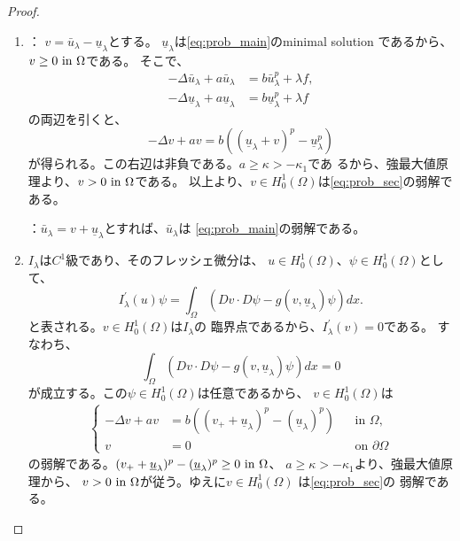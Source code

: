 \begin{proof}
 \begin{enumerate}[1.] \sage
  \item {}：
        $v = \bar{u}_\lambda - \underline{u}_\lambda$とする。
        $\underline{u}_\lambda$は\ref{eq:prob_main}のminimal solution
        であるから、$v \geq 0 ~\text{in}~ \Omega$である。
        そこで、
        \begin{align*}
         -\Delta \bar{u}_\lambda + a \bar{u}_\lambda &= b
         \bar{u}_\lambda^p + \lambda f, \\
         -\Delta \underline{u}_\lambda + a \underline{u}_\lambda &= b
         \underline{u}_\lambda^p + \lambda f
        \end{align*}
        の両辺を引くと、
        \[
        -\Delta v + a v = b \left( (\underline{u}_\lambda + v)^p -
        \underline{u}_\lambda^p \right)
        \]
        が得られる。この右辺は非負である。$a \geq \kappa > -\kappa_1$であ
        るから、強最大値原理より、$v > 0 ~\text{in}~ \Omega$である。
        以上より、$v \in H_0^1(\Omega)$は\ref{eq:prob_sec}の弱解である。

        ：$\bar{u}_\lambda = v +
        \underline{u}_\lambda$とすれば、$\bar{u}_\lambda$は
        \ref{eq:prob_main}の弱解である。
  \item $I_\lambda$は$C^1$級であり、そのフレッシェ微分は、
        $u \in H_0^1(\Omega)$、$\psi \in H_0^1(\Omega)$として、
        \[
         I^\prime_\lambda(u)\psi = \int_\Omega \left( Dv \cdot D\psi -
        g(v, \underline{u}_\lambda) \psi \right) dx.
        \]
        と表される。$v \in H_0^1(\Omega)$は$I_\lambda$の
        臨界点であるから、$I^\prime_\lambda(v) = 0$である。
        すなわち、
        \begin{equation}
         \int_\Omega \left( Dv \cdot D\psi - g(v,
                      \underline{u}_\lambda)\psi \right) dx = 0
         \label{eq:weak_sol_of_heart}        
        \end{equation}
        が成立する。この$\psi \in H_0^1(\Omega)$は任意であるから、
        $v \in H_0^1(\Omega)$は
        \begin{align}
         \left\{
          \begin{aligned}
           -\Delta v + a v &= b \left( (v_+ + \underline{u}_\lambda)^p -
           (\underline{u}_\lambda)^p \right) 
           & &\text{in~} \Omega, \\
           v &= 0 & &\text{on~} \partial\Omega
          \end{aligned}
         \right.
        \end{align}
        の弱解である。$(v_+ + \underline{u}_\lambda)^p -
           (\underline{u}_\lambda)^p \geq 0 ~\text{in}~ \Omega$、
        $a \geq \kappa > -\kappa_1$より、強最大値原理から、
        $v > 0 ~\text{in}~ \Omega$が従う。ゆえに$v \in H_0^1(\Omega)$
        は\ref{eq:prob_sec}の
        弱解である。 \qedhere
 \end{enumerate}
\end{proof}

